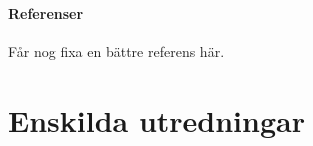 \documentclass{article}
\begin{document}
\subsection{Referenser}
\begin{thebibliography}{9}
Får nog fixa en bättre referens här.
\end{thebibliography}

\newpage
\part{Enskilda utredningar}
\renewcommand{\thesection}{\Alph{section}}	

\newpage

\newpage

\newpage

\newpage

\newpage

\newpage

\end{document}

